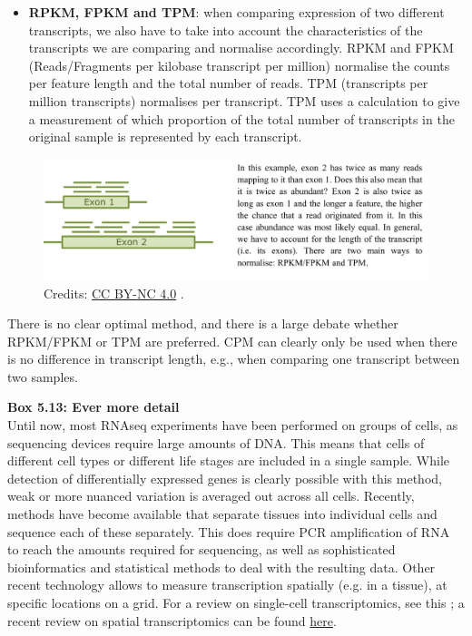 \begin{itemize}
\item \textbf{RPKM, FPKM and TPM}: when comparing expression of two different transcripts, we
also have to take into account the characteristics of the transcripts we
are comparing and normalise accordingly.  RPKM and FPKM (Reads/Fragments
per kilobase transcript per million) normalise the counts per feature
length and the total number of reads.  TPM (transcripts per million
transcripts) normalises per transcript.  TPM uses a calculation to give a
measurement of which proportion of the total number of transcripts in the
original sample is represented by each transcript.
\end{itemize}

\begin{figure}[!htbp]
\centering
\includegraphics[width=0.7\linewidth]{files/comparing-transcript-2264ff4d41c11a6b0a6f5618c6c83bff.pdf}
\caption[]{Credits: \href{https://creativecommons.org/licenses/by-nc/4.0/}{CC BY-NC 4.0} \cite{own_5_2024}.}
\label{comparing_transcripts}
\end{figure}

There is no clear optimal method, and there is a large debate whether
RPKM/FPKM or TPM are preferred.  CPM can clearly only be used when there is
no difference in transcript length, e.g., when comparing one transcript
between two samples.

\begin{framed}
\textbf{Box 5.13: Ever more detail}\\
Until now, most RNAseq experiments have been performed on groups of cells,
as sequencing devices require large amounts of DNA. This means that cells
of different cell types or different life stages are included in a single
sample. While detection of differentially expressed genes is clearly
possible with this method, weak or more nuanced variation is averaged out
across all cells. Recently, methods have become available that separate
tissues into individual cells and sequence each of these separately. This
does require PCR amplification of RNA to reach the amounts required for
sequencing, as well as sophisticated bioinformatics and statistical methods
to deal with the resulting data. Other recent technology allows to measure
transcription spatially (e.g. in a tissue), at specific locations on a grid.
For a review on single-cell transcriptomics, see this
\cite{Bacher_2016};
a recent review on spatial transcriptomics can be found
\href{https://www.nature.com/articles/s41587-022-01448-2}{here}.
\end{framed}


